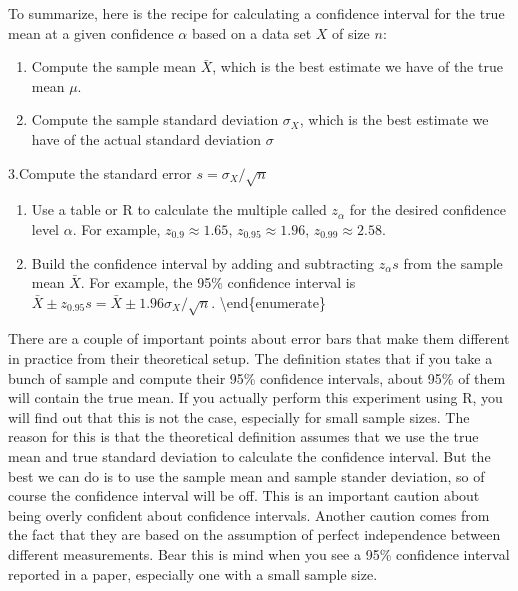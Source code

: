 \documentclass[
]{book}
\theoremstyle{definition}
\theoremstyle{definition}
\theoremstyle{definition}
\theoremstyle{remark}
\begin{document}
To summarize, here is the recipe for calculating a confidence interval for the true mean at a given confidence \(\alpha\) based on a data set \(X\) of size \(n\):

\begin{enumerate}
\def\labelenumi{\arabic{enumi}.}
\item
  Compute the sample mean \(\bar X\), which is the best estimate we have of the true mean \(\mu\).
\item
  Compute the sample standard deviation \(\sigma_{X}\), which is the best estimate we have of the actual standard deviation \(\sigma\)
\end{enumerate}

3.Compute the standard error \(s = \sigma_X/\sqrt{n}\)

\begin{enumerate}
\def\labelenumi{\arabic{enumi}.}
\setcounter{enumi}{3}
\item
  Use a table or R to calculate the multiple called \(z_\alpha\) for the desired confidence level \(\alpha\). For example, \(z_{0.9} \approx 1.65\), \(z_{0.95} \approx 1.96\), \(z_{0.99} \approx 2.58\).
\item
  Build the confidence interval by adding and subtracting \(z_\alpha s\) from the sample mean \(\bar X\). For example, the 95\% confidence interval is \(\bar X \pm z_{0.95} s= \bar X \pm 1.96\sigma_{X}/\sqrt{n}\).
  \textbackslash end\{enumerate\}
\end{enumerate}

There are a couple of important points about error bars that make them different in practice from their theoretical setup. The definition states that if you take a bunch of sample and compute their 95\% confidence intervals, about 95\% of them will contain the true mean. If you actually perform this experiment using R, you will find out that this is not the case, especially for small sample sizes. The reason for this is that the theoretical definition assumes that we use the true mean and true standard deviation to calculate the confidence interval. But the best we can do is to use the sample mean and sample stander deviation, so of course the confidence interval will be off. This is an important caution about being overly confident about confidence intervals. Another caution comes from the fact that they are based on the assumption of perfect independence between different measurements. Bear this is mind when you see a 95\% confidence interval reported in a paper, especially one with a small sample size.
\end{document}
